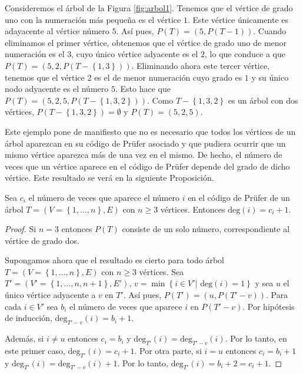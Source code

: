 \begin{exampleth}
Consideremos el árbol de la Figura \ref{fig:arbol1}. Tenemos que el vértice de grado uno con la numeración más pequeña es el vértice $1$. Este vértice únicamente es adayacente al vértice número $5$. Así pues, $P(T) = (5,P(T-1))$. Cuando eliminamos el primer vértice, obtenemos que el vértice de grado uno de menor numeración es el $3$, cuyo único vértice adyacente es el $2$, lo que conduce a que $P(T) = (5,2,P(T-\left\lbrace 1,3 \right\rbrace))$. Eliminando ahora este tercer vértice, tenemos que el vértice $2$ es el de menor numeración cuyo grado es $1$ y su único nodo adyacente es el número $5$. Esto hace que $P(T) = (5,2,5,P(T-\left\lbrace 1,3,2 \right\rbrace))$. Como $T-\left\lbrace 1,3,2 \right\rbrace$ es un árbol con dos vértices, $P(T-\left\lbrace 1,3,2 \right\rbrace) = \emptyset$ y $P(T) = (5,2,5)$.

Este ejemplo pone de manifiesto que no es necesario que todos los vértices de un árbol aparezcan en su código de Prüfer asociado y que pudiera ocurrir que un mismo vértice aparezca más de una vez en el mismo. De hecho, el número de veces que un vértice aparece en el código de Prüfer depende del grado de dicho vértice. Este resultado se verá en la siguiente Proposición.
\end{exampleth}

\begin{proposition} %
Sea $c_i$ el número de veces que aparece el número $i$ en el código de Prüfer de un árbol $T = (V=\left\lbrace 1,\dots, n \right\rbrace, E)$ con $n \geq 3$ vértices. Entonces $\text{deg}(i) = c_i +1$.
\end{proposition}

\begin{proof}
Si $n = 3$ entonces $P(T)$ consiste de un solo número, correspondiente al vértice de grado dos.

Supongamos ahora que el resultado es cierto para todo árbol $T = (V=\left\lbrace 1,\dots, n \right\rbrace, E)$ con $n \geq 3$ vértices. Sea $T' = (V'=\left\lbrace 1,\dots, n,n+1 \right\rbrace, E')$, $v = \min \left\lbrace i \in V' | \text{ deg}(i) = 1 \right\rbrace$ y sea $u$ el único vértice adyacente a $v$ en $T'$. Así pues, $P(T') = (u,P(T'-v))$. Para cada $i \in V'$ sea $b_i$ el número de veces que aparece $i$ en $P(T'-v)$. Por hipótesis de inducción, $\text{deg}_{T'-v}(i) = b_i + 1$.

Además, si $i \neq u$ entonces $c_i = b_i$ y $\text{deg}_{T'}(i) = \text{deg}_{T'-v}(i)$. Por lo tanto, en este primer caso, $\text{deg}_{T'}(i) = c_i + 1$. Por otra parte, si $i = u$ entonces $c_i = b_i + 1$ y $\text{deg}_{T'}(i) = \text{deg}_{T'-v}(i) +1$. Por lo tanto, $\text{deg}_{T'}(i) = b_i + 2 = c_i + 1$.
\end{proof}

